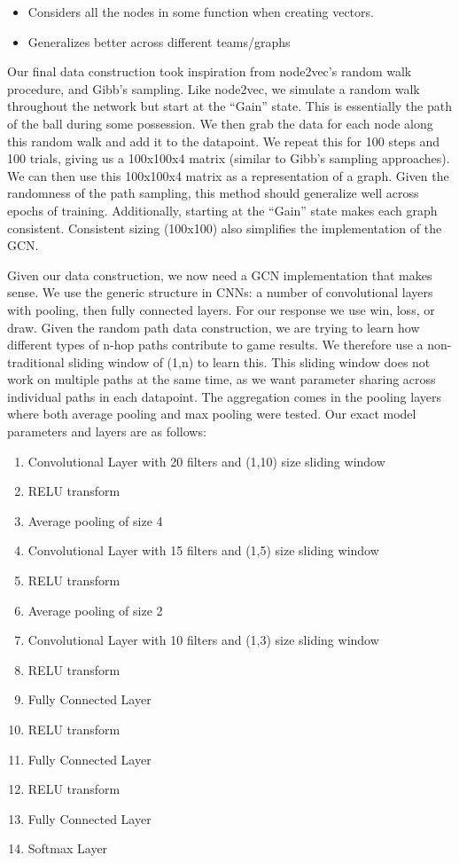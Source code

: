 \begin{itemize}
    \item Considers all the nodes in some function when creating vectors.

    \item Generalizes better across different teams/graphs 
\end{itemize}


Our final data construction took inspiration from node2vec's random walk procedure, and Gibb's sampling. Like node2vec, we simulate a random walk throughout the network but start at the ``Gain'' state. This is essentially the path of the ball during some possession.  We then grab the data for each node along this random walk and add it to the datapoint. We repeat this for 100 steps and 100 trials, giving us a 100x100x4 matrix (similar to Gibb's sampling approaches). We can then use this 100x100x4 matrix as a representation of a graph. Given the randomness of the path sampling, this method should generalize well across epochs of training. Additionally, starting at the ``Gain'' state makes each graph consistent. Consistent sizing (100x100) also simplifies the implementation of the GCN. 

Given our data construction, we now need a GCN implementation that makes sense. We use the generic structure in CNNs: a number of convolutional layers with pooling, then fully connected layers. For our response we use win, loss, or draw. Given the random path data construction, we are trying to learn how different types of n-hop paths contribute to game results. We therefore use a non-traditional sliding window of (1,n) to learn this. This sliding window does not work on multiple paths at the same time, as we want parameter sharing across individual paths in each datapoint. The aggregation comes in the pooling layers where both average pooling and max pooling were tested. Our exact model parameters and layers are as follows: 

\begin{enumerate}
    \item Convolutional Layer with 20 filters and (1,10) size sliding window
    \item RELU transform
    \item Average pooling of size 4
    \item Convolutional Layer with 15 filters and (1,5) size sliding window
    \item RELU transform
    \item Average pooling of size 2
    \item Convolutional Layer with 10 filters and (1,3) size sliding window
    \item RELU transform
    \item Fully Connected Layer
    \item RELU transform
    \item Fully Connected Layer
    \item RELU transform
    \item Fully Connected Layer
    \item Softmax Layer
\end{enumerate}

